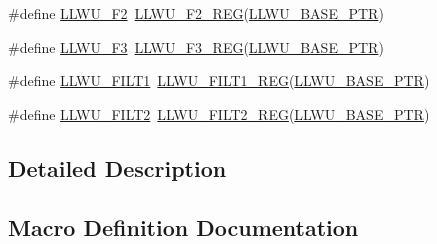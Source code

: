 \begin{DoxyCompactItemize}
\item 
\#define \hyperlink{group___l_l_w_u___register___accessor___macros_gaf234482694d2528fddefe57b14eaa942}{L\+L\+W\+U\+\_\+\+F2}~\hyperlink{group___l_l_w_u___register___accessor___macros_gae1358cf4b6e51d98bc34424d263874ec}{L\+L\+W\+U\+\_\+\+F2\+\_\+\+R\+EG}(\hyperlink{group___l_l_w_u___peripheral_ga89c97b9e8756088cb3d8617c022ae6ac}{L\+L\+W\+U\+\_\+\+B\+A\+S\+E\+\_\+\+P\+TR})
\item 
\#define \hyperlink{group___l_l_w_u___register___accessor___macros_gaaf3f95074e10d498b1522014ab7d5bfe}{L\+L\+W\+U\+\_\+\+F3}~\hyperlink{group___l_l_w_u___register___accessor___macros_ga302b69ef5f54896934af78a6e536a246}{L\+L\+W\+U\+\_\+\+F3\+\_\+\+R\+EG}(\hyperlink{group___l_l_w_u___peripheral_ga89c97b9e8756088cb3d8617c022ae6ac}{L\+L\+W\+U\+\_\+\+B\+A\+S\+E\+\_\+\+P\+TR})
\item 
\#define \hyperlink{group___l_l_w_u___register___accessor___macros_ga0ccd44a49b9f822b80e5d8c4935d94fe}{L\+L\+W\+U\+\_\+\+F\+I\+L\+T1}~\hyperlink{group___l_l_w_u___register___accessor___macros_ga9c1748a1618bcfc691f573c87202c4d3}{L\+L\+W\+U\+\_\+\+F\+I\+L\+T1\+\_\+\+R\+EG}(\hyperlink{group___l_l_w_u___peripheral_ga89c97b9e8756088cb3d8617c022ae6ac}{L\+L\+W\+U\+\_\+\+B\+A\+S\+E\+\_\+\+P\+TR})
\item 
\#define \hyperlink{group___l_l_w_u___register___accessor___macros_gae5e6484abe7ce06b0e85852c098959e7}{L\+L\+W\+U\+\_\+\+F\+I\+L\+T2}~\hyperlink{group___l_l_w_u___register___accessor___macros_ga71f3ec982a13da3009b07fea60045d7a}{L\+L\+W\+U\+\_\+\+F\+I\+L\+T2\+\_\+\+R\+EG}(\hyperlink{group___l_l_w_u___peripheral_ga89c97b9e8756088cb3d8617c022ae6ac}{L\+L\+W\+U\+\_\+\+B\+A\+S\+E\+\_\+\+P\+TR})
\end{DoxyCompactItemize}


\subsection{Detailed Description}


\subsection{Macro Definition Documentation}
\mbox{\label{group___l_l_w_u___register___accessor___macros_ga0b1034b705393cb19dc8bdc643242e0b}} 
